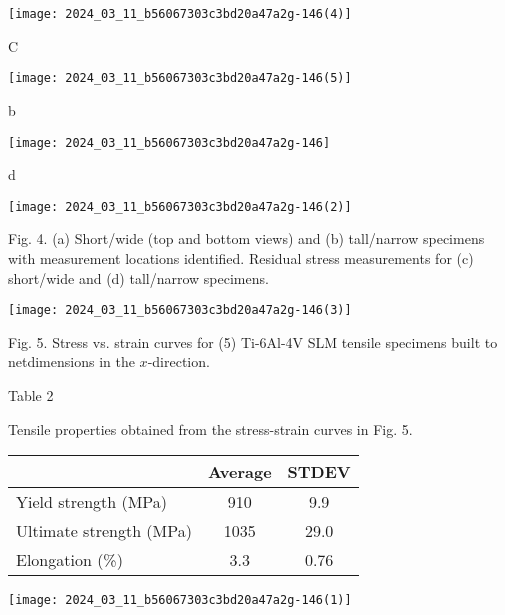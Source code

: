 \documentclass[10pt]{article}
\begin{document}
\begin{center}
\texttt{[image: 2024\_03\_11\_b56067303c3bd20a47a2g-146(4)]}
\end{center}

C

\begin{center}
\texttt{[image: 2024\_03\_11\_b56067303c3bd20a47a2g-146(5)]}
\end{center}

b

\begin{center}
\texttt{[image: 2024\_03\_11\_b56067303c3bd20a47a2g-146]}
\end{center}

d

\begin{center}
\texttt{[image: 2024\_03\_11\_b56067303c3bd20a47a2g-146(2)]}
\end{center}

Fig. 4. (a) Short/wide (top and bottom views) and (b) tall/narrow specimens with measurement locations identified. Residual stress measurements for (c) short/wide and (d) tall/narrow specimens.

\begin{center}
\texttt{[image: 2024\_03\_11\_b56067303c3bd20a47a2g-146(3)]}
\end{center}

Fig. 5. Stress vs. strain curves for (5) Ti-6Al-4V SLM tensile specimens built to netdimensions in the $x$-direction.

Table 2

Tensile properties obtained from the stress-strain curves in Fig. 5.

\begin{center}
\begin{tabular}{lcc}
\hline
 & Average & STDEV \\
\hline
Yield strength (MPa) & 910 & 9.9 \\
Ultimate strength (MPa) & 1035 & 29.0 \\
Elongation (\%) & 3.3 & 0.76 \\
\hline
\end{tabular}
\end{center}

\begin{center}
\texttt{[image: 2024\_03\_11\_b56067303c3bd20a47a2g-146(1)]}
\end{center}
\end{document}

